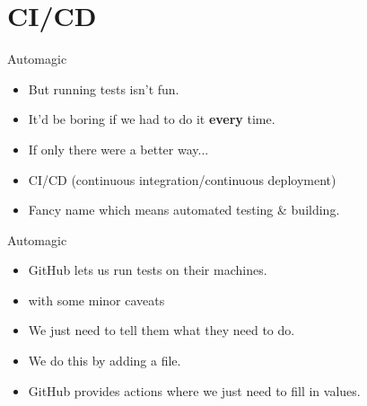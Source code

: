 \documentclass[usenames,dvipsnames]{beamer}
\newcommand{\filet}[1]{\texttt{\detokenize{#1}}}
\begin{document}
\section{CI/CD}

\begin{frame}{Automagic}
    \begin{itemize}[<+->]
        \item{}But running tests isn't fun.
        \item{}It'd be boring if we had to do it \textbf{every} time.
        \item{}If only there were a better way...
        \item{}CI/CD (continuous integration/continuous deployment)
        \item{}Fancy name which means automated testing \& building.
    \end{itemize}
\end{frame}

\begin{frame}{Automagic}
    \begin{itemize}[<+->]
        \item{}GitHub lets us run tests on their machines.
        \item{}{\small with some minor caveats}
        \item{}We just need to tell them what they need to do.
        \item{}We do this by adding a \filet{yaml} file.
        \item{}GitHub provides actions where we just need to fill in values.
    \end{itemize}
\end{frame}
\end{document}
